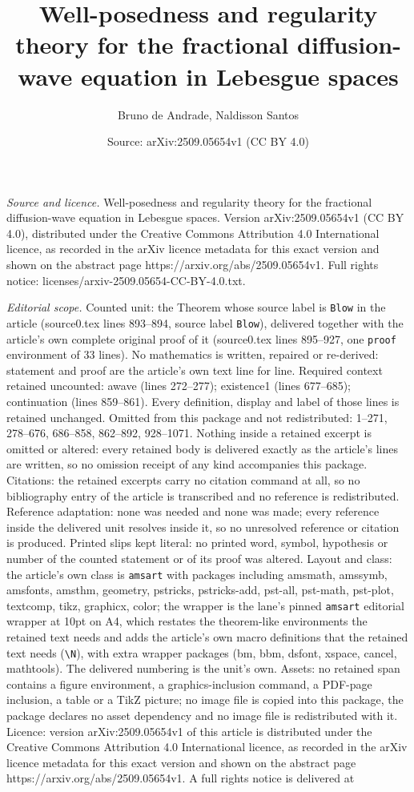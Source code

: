\documentclass[10pt,a4paper]{amsart}
\title[Well-posedness and regularity theory for the fractional diff]{Well-posedness and regularity theory for the fractional diffusion-wave equation in Lebesgue spaces}
\author{Bruno de Andrade, Naldisson Santos}
\date{Source: arXiv:2509.05654v1 (CC BY 4.0)}
\begin{document}
\maketitle

\noindent\emph{Source and licence.} Well-posedness and regularity theory for the fractional diffusion-wave equation in Lebesgue spaces. Version arXiv:2509.05654v1 (CC BY 4.0), distributed under the Creative Commons Attribution 4.0 International licence, as recorded in the arXiv licence metadata for this exact version and shown on the abstract page https://arxiv.org/abs/2509.05654v1. Full rights notice: licenses/arxiv-2509.05654-CC-BY-4.0.txt.\par\smallskip

\noindent\textit{Editorial scope.} Counted unit: the Theorem whose source label is \texttt{Blow} in the article (source0.tex lines 893--894, source label \texttt{Blow}), delivered together with the article's own complete original proof of it (source0.tex lines 895--927, one \texttt{proof} environment of 33 lines). No mathematics is written, repaired or re-derived: statement and proof are the article's own text line for line. Required context retained uncounted: awave (lines 272--277); existence1 (lines 677--685); continuation (lines 859--861). Every definition, display and label of those lines is retained unchanged. Omitted from this package and not redistributed: 1--271, 278--676, 686--858, 862--892, 928--1071. Nothing inside a retained excerpt is omitted or altered: every retained body is delivered exactly as the article's lines are written, so no omission receipt of any kind accompanies this package. Citations: the retained excerpts carry no citation command at all, so no bibliography entry of the article is transcribed and no reference is redistributed. Reference adaptation: none was needed and none was made; every reference inside the delivered unit resolves inside it, so no unresolved reference or citation is produced. Printed slips kept literal: no printed word, symbol, hypothesis or number of the counted statement or of its proof was altered. Layout and class: the article's own class is \texttt{amsart} with packages including amsmath, amssymb, amsfonts, amsthm, geometry, pstricks, pstricks-add, pst-all, pst-math, pst-plot, textcomp, tikz, graphicx, color; the wrapper is the lane's pinned \texttt{amsart} editorial wrapper at 10pt on A4, which restates the theorem-like environments the retained text needs and adds the article's own macro definitions that the retained text needs (\texttt{\textbackslash N}), with extra wrapper packages (bm, bbm, dsfont, xspace, cancel, mathtools). The delivered numbering is the unit's own. Assets: no retained span contains a figure environment, a graphics-inclusion command, a PDF-page inclusion, a table or a TikZ picture; no image file is copied into this package, the package declares no asset dependency and no image file is redistributed with it. Licence: version arXiv:2509.05654v1 of this article is distributed under the Creative Commons Attribution 4.0 International licence, as recorded in the arXiv licence metadata for this exact version and shown on the abstract page https://arxiv.org/abs/2509.05654v1. A full rights notice is delivered at 
\end{document}
